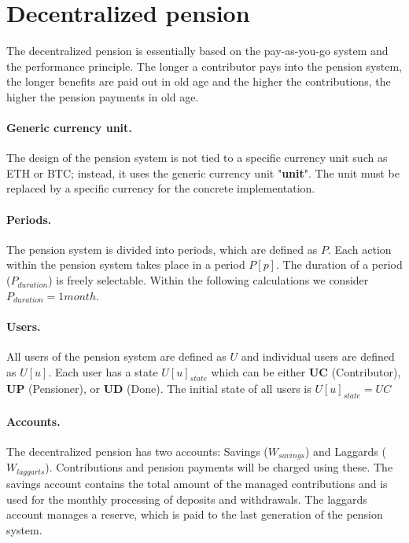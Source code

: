 \section{Decentralized pension}
The decentralized pension is essentially based on the pay-as-you-go system and the
performance principle. The longer a contributor pays into the pension system, 
the longer benefits are paid out in old age and the higher the contributions,
the higher the pension payments in old age.

\paragraph{Generic currency unit.} The design of the pension system is not tied to a specific currency unit such as ETH or BTC; instead, it uses the generic currency unit "\textbf{unit}". The unit must be replaced by a specific currency for the concrete implementation.

\paragraph{Periods.} The pension system is divided into periods, which are defined as $P$. Each action within the pension system takes place in a period $P[p]$. The duration of a period ($P_{duration}$) is freely selectable. Within the following calculations we consider $P_{duration} = 1 month$.

\paragraph{Users.} All users of the pension system are defined as $U$ and individual users are defined as $U[u]$. Each user has a state $U[u]_{state}$ which can be either \textbf{UC} (Contributor),
\textbf{UP} (Pensioner), or \textbf{UD} (Done).
The initial state of all users is $U[u]_{state} = UC$ 

\paragraph{Accounts.} The decentralized pension has two accounts: Savings ($W_{savings}$) and Laggards  ($W_{laggarts}$). Contributions and pension payments will be charged using these. The savings account contains the total amount of the managed contributions and is used for the monthly processing of deposits and withdrawals. The laggards account manages a reserve, which is paid to the last generation of the pension system.

